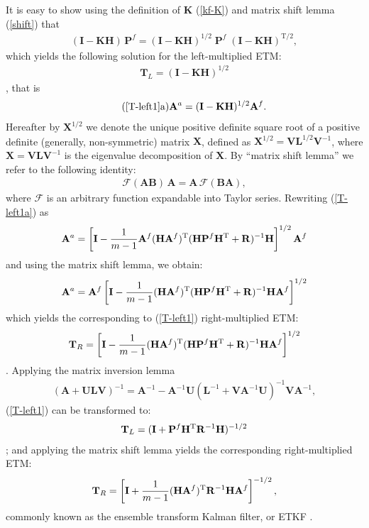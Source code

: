 \documentclass[11pt]{report}
\newcommand{\mb} {\mathbf}
\newcommand{\T}{^{\tiny \mathrm T}}
\newcommand{\TS}{^{{\mathrm T}/2}}
\begin{document}
It is easy to show using the definition of $\mb K$ (\ref{kf-K}) and matrix shift lemma (\ref{shift}) that 
\begin{align*}
    (\mb I - \mb K \mb H) \, \mb P^f = (\mb I - \mb K \mb H)^{1/2} \; \mb P^f \; (\mb I - \mb K \mb H)\TS,
\end{align*}
which yields the following solution for the left-multiplied ETM:
\begin{align}
  \label{T-left1}
  \mb T_L = (\mb I - \mb K \mb H)^{1/2}
\end{align}
\citep{sak08b}, that is
\begin{align}
  \tag{\ref{T-left1}a}
  \label{T-left1a}
  \mb A^a =  (\mb I - \mb K \mb H)^{1/2} \mb A^f.
\end{align}
Hereafter by $\mb X^{1/2}$ we denote the unique positive definite square root of a positive definite (generally, non-symmetric) matrix $\mb X$, defined as $\mb X^{1/2} = \mb V \mb L^{1/2} \mb V^{-1}$, where $\mb X = \mb V \mb L \mb V^{-1}$ is the eigenvalue decomposition of $\mb X$.
By ``matrix shift lemma'' we refer to the following identity:
\begin{align}
  \label{shift}
  \mathcal F(\mb A \mb B) \, \mb A = \mb A \, \mathcal F(\mb B \mb A),
\end{align}
where $\mathcal F$ is an arbitrary function expandable into Taylor series.
Rewriting (\ref{T-left1a}) as
\begin{align*}
  \mb A^a = \left[ \mb I - \frac{1}{m-1} \mb A^f (\mb H \mb A^f)\T  (\mb H \mb P^f \mb H\T + \mb R)^{-1} \mb H \right]^{1/2} \mb A^f
\end{align*}
and using the matrix shift lemma, we obtain:
\begin{align*}
  \mb A^a = \mb A^f \left[ \mb I - \frac{1}{m-1} (\mb H \mb A^f)\T  (\mb H \mb P^f \mb H\T + \mb R)^{-1} \mb H \mb A^f \right]^{1/2}
\end{align*}
which yields the corresponding to (\ref{T-left1}) right-multiplied ETM:
\begin{align}
  \label{T-right1}
  \mb T_R = \left[ \mb I -  \frac{1}{m-1} (\mb H \mb A^f)\T  (\mb H \mb P^f \mb H\T + \mb R)^{-1} \mb H \mb A^f \right]^{1/2}
\end{align}
\citep{eve04a}.
Applying the matrix inversion lemma
\begin{align}
  \label{inv}
  (\mb A + \mb U \mb L \mb V)^{-1} = \mb A^{-1} - \mb A^{-1} \mb U (\mb L^{-1} + \mb V \mb A^{-1} \mb U)^{-1} \mb V \mb A^{-1},
\end{align}
(\ref{T-left1}) can be transformed to:
\begin{align}
  \label{T-left2}
  \mb T_L = (\mb I + \mb P^f \mb H\T \mb R^{-1} \mb H)^{-1/2}
\end{align}
\citep{sak11a}; and applying the matrix shift lemma yields the corresponding right-multiplied ETM:
\begin{align}
  \label{etkf}
  \mb T_R = \left[\mb I +  \frac{1}{m-1} (\mb H \mb A^f)\T \mb R^{-1} \mb H \mb A^f \right]^{-1/2},
\end{align}
commonly known as the ensemble transform Kalman filter, or ETKF \citep{bis01a}.
\end{document}
